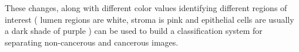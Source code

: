 
These changes, along with different color values identifying different regions of interest ( lumen regions are white, stroma is pink and epithelial cells are usually a dark shade of purple ) can be used to build a classification system for separating non-cancerous and cancerous images.
